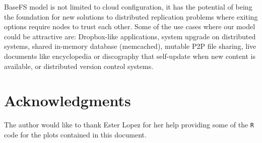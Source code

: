\documentclass{sig-alternate}
\begin{document}


BaseFS model is not limited to cloud configuration, it has the potential of being the foundation for new solutions to distributed replication problems where exiting options require nodes to trust each other. Some of the use cases where our model could be attractive are: Dropbox-like applications, system upgrade on distributed systems, shared in-memory database (memcached), mutable P2P file sharing, live documents like encyclopedia or discography that self-update when new content is available, or distributed version control systems.


\section{Acknowledgments}
The author would like to thank Ester Lopez for her help providing some of the \texttt{R} code for the plots contained in this document.

%

%
%
\end{document}
